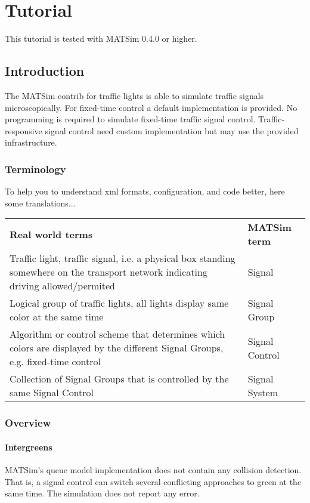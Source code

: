 \chapter{Tutorial}

This tutorial is tested with MATSim 0.4.0 or higher.

\section{Introduction}

The MATSim contrib for traffic lights is able to simulate traffic signals microscopically. 
For fixed-time control a default implementation is provided.  
No programming is required to simulate fixed-time traffic signal control. 
Traffic-responsive signal control need custom implementation but may use the provided infrastructure. 



\subsection{Terminology}

To help you to understand xml formats, configuration, and code better, here some translations...
\begin{tabular}{ll}
\textbf{Real world terms} & \textbf{MATSim term} \\ 
Traffic light, traffic signal, i.e. a physical box standing somewhere on the transport network indicating driving allowed/permited & Signal \\ 
Logical group of traffic lights, all lights display same color at the same time & Signal Group \\ 
Algorithm or control scheme that determines which colors are displayed by the different Signal Groups, e.g. fixed-time control & Signal Control \\ 
Collection of Signal Groups that is controlled by the same Signal Control & Signal System
\end{tabular}

\subsection{Overview}

\subsubsection{Intergreens}

MATSim's queue model implementation does not contain any collision detection. 
That is, a signal control can switch several conflicting approaches to green at the same time. 
The simulation does not report any error. 


